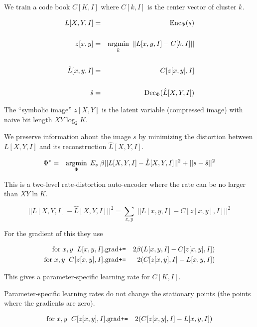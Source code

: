 {

We train a code book $C[K,I]$ where $C[k,I]$ is the center vector of cluster $k$.

{\huge
\begin{eqnarray*}
L[X,Y,I] & = & \mathrm{Enc}_\Phi(s) \\
\\
z[x,y] & = & \operatorname*{argmin}_k \;||L[x,y,I] - C[k,I]|| \\
\\
\hat{L}[x,y,I] & = & C[z[x,y],I] \\
\\
\hat{s} & = & \mathrm{Dec}_\Phi(\hat{L}[X,Y,I])
\end{eqnarray*}
}

\vfill
The ``symbolic image'' $z[X,Y]$ is the latent variable (compressed image) with naive bit length $XY\log_2 K$.


We preserve information about the image $s$ by minimizing the distortion between $L[X,Y,I]$ and its reconstruction $\hat{L}[X,Y,I]$.

\vfill
\begin{eqnarray*}
\Phi^* & = & \operatorname*{argmin}_\Phi \;E_s\; \beta||L[X,Y,I] - \hat{L}[X,Y,I]||^2 + ||s -\hat{s}||^2
\end{eqnarray*}

\vfill
This is a two-level rate-distortion auto-encoder where the rate can be no larger than $XY\ln K$.


$$||L[X,Y,I] - \hat{L}[X,Y,I]||^2 = \sum_{x,y}\;||L[x,y,I] - C[z[x,y],I]||^2$$

\vfill
For the gradient of this they use

\begin{eqnarray*}
\mathrm{for}\;x,y\;\;L[x,y,I].\mathrm{grad} & \mbox{\tt +=} & 2\beta({L}[x,y,I]- C[z[x,y],I]) \\
\mathrm{for}\;x,y\;\;C[z[x,y],I].\mathrm{grad} & \mbox{\tt +=} & 2(C[z[x,y],I] - L[x,y,I])
\end{eqnarray*}

\vfill
This gives a parameter-specific learning rate for $C[K,I]$.

\vfill
Parameter-specific learning rates do not change the stationary points (the points where the gradients are zero).


\begin{eqnarray*}
\mathrm{for}\;x,y\;\;C[z[x,y],I].\mathrm{grad} & \mbox{\tt +=} & 2(C[z[x,y],I] - L[x,y,I])
\end{eqnarray*}

}
